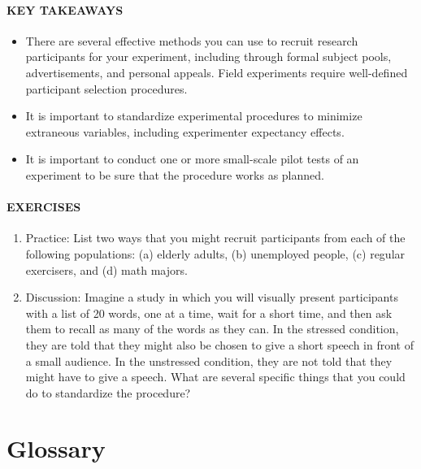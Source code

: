 \documentclass[
]{krantz}
\providecommand{\tightlist}{%
  \setlength{\itemsep}{0pt}\setlength{\parskip}{0pt}}
\begin{document}
\hypertarget{key-takeaways-13}{%
\paragraph*{KEY TAKEAWAYS}\label{key-takeaways-13}}

\begin{itemize}
\tightlist
\item
  There are several effective methods you can use to recruit research participants for your experiment, including through formal subject pools, advertisements, and personal appeals. Field experiments require well-defined participant selection procedures.
\item
  It is important to standardize experimental procedures to minimize extraneous variables, including experimenter expectancy effects.
\item
  It is important to conduct one or more small-scale pilot tests of an experiment to be sure that the procedure works as planned.
\end{itemize}

\hypertarget{exercises-12}{%
\paragraph*{EXERCISES}\label{exercises-12}}

\begin{enumerate}
\def\labelenumi{\arabic{enumi}.}
\tightlist
\item
  Practice: List two ways that you might recruit participants from each of the following populations: (a) elderly adults, (b) unemployed people, (c) regular exercisers, and (d) math majors.
\item
  Discussion: Imagine a study in which you will visually present participants with a list of 20 words, one at a time, wait for a short time, and then ask them to recall as many of the words as they can. In the stressed condition, they are told that they might also be chosen to give a short speech in front of a small audience. In the unstressed condition, they are not told that they might have to give a speech. What are several specific things that you could do to standardize the procedure?
\end{enumerate}

\hypertarget{glossary-4}{%
\section{Glossary}\label{glossary-4}}
\end{document}
